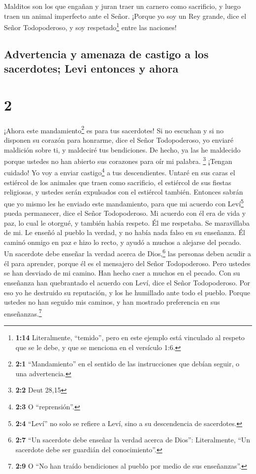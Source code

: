  Malditos son los que engañan y juran traer un carnero
como sacrificio, y luego traen un animal imperfecto ante el Señor.
¡Porque yo soy un Rey grande, dice el Señor Todopoderoso, y soy
respetado\footnote{\textbf{1:14} Literalmente, ``temido'', pero en este
  ejemplo está vinculado al respeto que se le debe, y que se menciona en
  el versículo 1:6.} entre las naciones!

\hypertarget{advertencia-y-amenaza-de-castigo-a-los-sacerdotes-levi-entonces-y-ahora}{%
\subsection{Advertencia y amenaza de castigo a los sacerdotes; Levi
entonces y
ahora}\label{advertencia-y-amenaza-de-castigo-a-los-sacerdotes-levi-entonces-y-ahora}}

\hypertarget{section-1}{%
\section{2}\label{section-1}}

 ¡Ahora este mandamiento\footnote{\textbf{2:1}
  ``Mandamiento'' en el sentido de las instrucciones que debían seguir,
  o una advertencia.} es para tus sacerdotes!  Si no
escuchan y si no disponen su corazón para honrarme, dice el Señor
Todopoderoso, yo enviaré maldición sobre ti, y maldeciré tus
bendiciones. De hecho, ya las he maldecido porque ustedes no han abierto
sus corazones para oír mi palabra. \footnote{\textbf{2:2} Deut 28,15}
 ¡Tengan cuidado! Yo voy a enviar castigo\footnote{\textbf{2:3}
  O ``reprensión''.} a tus descendientes. Untaré en sus caras el
estiércol de los animales que traen como sacrificio, el estiércol de sus
fiestas religiosas, y ustedes serán expulsados con el estiércol también.
 Entonces sabrán que yo mismo les he enviado este
mandamiento, para que mi acuerdo con Leví\footnote{\textbf{2:4} ``Leví''
  no solo se refiere a Leví, sino a su descendencia de sacerdotes.}
pueda permanecer, dice el Señor Todopoderoso.  Mi acuerdo
con él era de vida y paz, lo cual le otorgué, y también había respeto.
Él me respetaba. Se maravillaba de mi.  Le enseñó al
pueblo la verdad, y no había nada falso en su enseñanza. Él caminó
onmigo en paz e hizo lo recto, y ayudó a muchos a alejarse del pecado.
 Un sacerdote debe enseñar la verdad acerca de
Dios,\footnote{\textbf{2:7} ``Un sacerdote debe enseñar la verdad acerca
  de Dios'': Literalmente, ``Un sacerdote debe ser guardián del
  conocimiento''.} las personas deben acudir a él para aprender, porque
él es el mensajero del Señor Todopoderoso.  Pero ustedes
se han desviado de mi camino. Han hecho caer a muchos en el pecado. Con
su enseñanza han quebrantado el acuerdo con Leví, dice el Señor
Todopoderoso.  Por eso yo he destruido su reputación, y
los he humillado ante todo el pueblo. Porque ustedes no han seguido mis
caminos, y han mostrado preferencia en sus enseñanzas.\footnote{\textbf{2:9}
  O ``No han traído bendiciones al pueblo por medio de sus enseñanzas''.}

